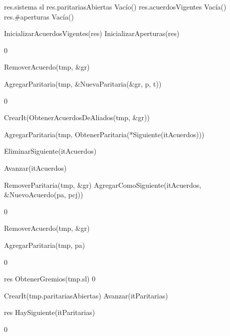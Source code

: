 {
	\state res.sistema \asig sl						
	\state res.paritariasAbiertas \asig Vacío()		
	\state res.acuerdosVigentes \asig Vacía()		
	\state res.\#aperturas \asig Vacía()			
	\state

	\state InicializarAcuerdosVigentes(res)			
	\state InicializarAperturas(res)				
}
{0}

{
							
		\state RemoverAcuerdo(tmp, \&gr)							
	\endif
	\state

	\state AgregarParitaria(tmp, \&NuevaParitaria(\&gr, p, t))		
}
{0}

{

	\state {} \asig CrearIt(ObtenerAcuerdosDeAliados(tmp, \&gr))		
			
		\state

		\state AgregarParitaria(tmp, ObtenerParitaria(*Siguiente(itAcuerdos)))		

		\state EliminarSiguiente(itAcuerdos)										

		\state
		\state Avanzar(itAcuerdos)													
	\endwhile
	\state

	\state {} \asig RemoverParitaria(tmp, \&gr)		
	\state AgregarComoSiguiente(itAcuerdos, \&NuevoAcuerdo(pa, pcj))			
}
{0}

{
	\state {} \asig RemoverAcuerdo(tmp, \&gr)			

	\state AgregarParitaria(tmp, pa)											
}
{0}

{
	\state res \asig ObtenerGremios(tmp.sl)		
}
{0}

{
	\state {} \asig CrearIt(tmp.paritariasAbiertas)		
			
		\state
		\state Avanzar(itParitarias)				
	\endwhile
	\state

	\state res \asig HaySiguiente(itParitarias)		
}
{0}

